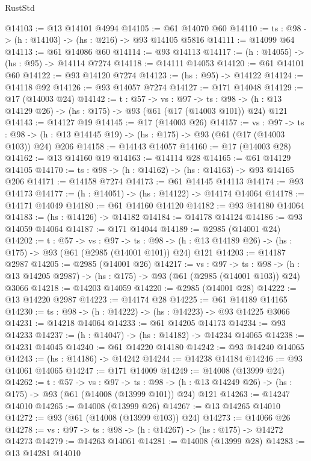 \begin{lexlean}{RustStd}
\begin{coremodule}
@14103 := @13 @14101 @4994
@14105 := @61 @14070 @60
@14110 := {ts : @98} -> (h : @14103) -> (hs : @216) -> @93 @14105 @5816
@14111 := @14099 @64
@14113 := @61 @14086 @60
@14114 := @93 @14113
@14117 := (h : @14055) -> (hs : @95) -> @14114 @7274
@14118 := @14111 @14053
@14120 := @61 @14101 @60
@14122 := @93 @14120 @7274
@14123 := (hs : @95) -> @14122
@14124 := @14118 @92
@14126 := @93 @14057 @7274
@14127 := @171 @14048
@14129 := @17 (@14003 @24)
@14142 := {t : @57} ->
  {vs : @97} ->
  {ts : @98} -> (h : @13 @14129 @26) -> (hs : @175) -> @93 (@61 (@17 (@14003 @101)) @24) @121
@14143 := @14127 @19
@14145 := @17 (@14003 @26)
@14157 := {vs : @97} ->
  {ts : @98} -> (h : @13 @14145 @19) -> (hs : @175) -> @93 (@61 (@17 (@14003 @103)) @24) @206
@14158 := @14143 @14057
@14160 := @17 (@14003 @28)
@14162 := @13 @14160 @19
@14163 := @14114 @28
@14165 := @61 @14129 @14105
@14170 := {ts : @98} -> (h : @14162) -> (hs : @14163) -> @93 @14165 @206
@14171 := @14158 @7274
@14173 := @61 @14145 @14113
@14174 := @93 @14173
@14177 := (h : @14051) -> (hs : @14122) -> @14174 @14064
@14178 := @14171 @14049
@14180 := @61 @14160 @14120
@14182 := @93 @14180 @14064
@14183 := (hs : @14126) -> @14182
@14184 := @14178 @14124
@14186 := @93 @14059 @14064
@14187 := @171 @14044
@14189 := @2985 (@14001 @24)
@14202 := {t : @57} ->
  {vs : @97} ->
  {ts : @98} -> (h : @13 @14189 @26) -> (hs : @175) -> @93 (@61 (@2985 (@14001 @101)) @24) @121
@14203 := @14187 @2987
@14205 := @2985 (@14001 @26)
@14217 := {vs : @97} ->
  {ts : @98} -> (h : @13 @14205 @2987) -> (hs : @175) -> @93 (@61 (@2985 (@14001 @103)) @24) @3066
@14218 := @14203 @14059
@14220 := @2985 (@14001 @28)
@14222 := @13 @14220 @2987
@14223 := @14174 @28
@14225 := @61 @14189 @14165
@14230 := {ts : @98} -> (h : @14222) -> (hs : @14223) -> @93 @14225 @3066
@14231 := @14218 @14064
@14233 := @61 @14205 @14173
@14234 := @93 @14233
@14237 := (h : @14047) -> (hs : @14182) -> @14234 @14065
@14238 := @14231 @14045
@14240 := @61 @14220 @14180
@14242 := @93 @14240 @14065
@14243 := (hs : @14186) -> @14242
@14244 := @14238 @14184
@14246 := @93 @14061 @14065
@14247 := @171 @14009
@14249 := @14008 (@13999 @24)
@14262 := {t : @57} ->
  {vs : @97} ->
  {ts : @98} -> (h : @13 @14249 @26) -> (hs : @175) -> @93 (@61 (@14008 (@13999 @101)) @24) @121
@14263 := @14247 @14010
@14265 := @14008 (@13999 @26)
@14267 := @13 @14265 @14010
@14272 := @93 (@61 (@14008 (@13999 @103)) @24)
@14273 := @14066 @26
@14278 := {vs : @97} -> {ts : @98} -> (h : @14267) -> (hs : @175) -> @14272 @14273
@14279 := @14263 @14061
@14281 := @14008 (@13999 @28)
@14283 := @13 @14281 @14010

\end{coremodule}
\end{lexlean}
